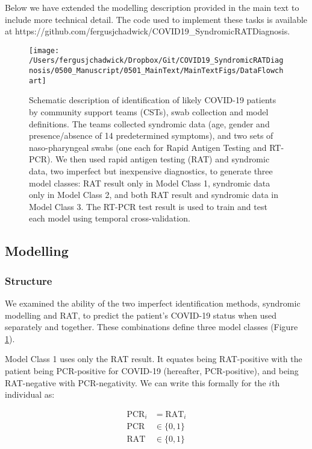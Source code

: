 \documentclass[]{elsarticle} %
\begin{document}
Below we have extended the modelling description provided in the main text to include more technical detail.
The code used to implement these tasks is available at https://github.com/fergusjchadwick/COVID19\_SyndromicRATDiagnosis.

\begin{figure}
\texttt{[image: /Users/fergusjchadwick/Dropbox/Git/COVID19\_SyndromicRATDiagnosis/0500\_Manuscript/0501\_MainText/MainTextFigs/DataFlowchart]} \caption{Schematic description of identification of likely COVID-19 patients by community support teams (CSTs), swab collection and model definitions. The teams collected syndromic data (age, gender and presence/absence of 14 predetermined symptoms), and two sets of naso-pharyngeal swabs (one each for Rapid Antigen Testing and RT-PCR). We then used rapid antigen testing (RAT) and syndromic data, two imperfect but inexpensive diagnostics, to generate three model classes: RAT result only in Model Class 1, syndromic data only in Model Class 2, and both RAT result and syndromic data in Model Class 3. The RT-PCR test result is used to train and test each model using temporal cross-validation.}\label{fig:data-flowchart2}
\end{figure}

\hypertarget{modelling}{%
\subsection{Modelling}\label{modelling}}

\hypertarget{structure}{%
\subsubsection{Structure}\label{structure}}

We examined the ability of the two imperfect identification methods, syndromic modelling and RAT, to predict the patient's COVID-19 status when used separately and together.
These combinations define three model classes (Figure \ref{fig:data-flowchart2}).

Model Class 1 uses only the RAT result.
It equates being RAT-positive with the patient being PCR-positive for COVID-19 (hereafter, PCR-positive), and being RAT-negative with PCR-negativity.
We can write this formally for the \(i\)th individual as:

\begin{equation}\begin{aligned}
\text{PCR}_i &= \text{RAT}_i \\
\text{PCR} &\in\{0,1\} \\
\text{RAT} &\in\{0,1\}
\end{aligned}\end{equation}\ignorespacesafterend
\end{document}
